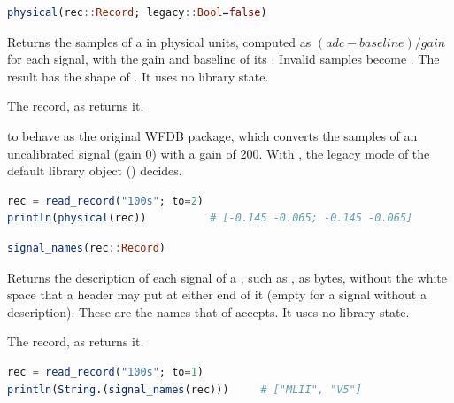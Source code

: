 \begin{lstlisting}[language=Julia,style=signature]
physical(rec::Record; legacy::Bool=false)
\end{lstlisting}
Returns the samples of a  in physical units, computed as $(\mathit{adc} -
\mathit{baseline}) / \mathit{gain}$ for each signal, with the gain and baseline of its
. Invalid samples become . The result has the shape of
. It uses no library state.
\begin{params}
\item[rec] The record, as  returns it.
\item[legacy]  to behave as the original WFDB package, which converts the
  samples of an uncalibrated signal (gain 0) with a gain of 200. With , the
  legacy mode of the default library object () decides.
\end{params}
\begin{lstlisting}[language=Julia,style=example]
rec = read_record("100s"; to=2)
println(physical(rec))          # [-0.145 -0.065; -0.145 -0.065]
\end{lstlisting}

\begin{lstlisting}[language=Julia,style=signature]
signal_names(rec::Record)
\end{lstlisting}
Returns the description of each signal of a , such as , as
bytes, without the white space that a header may put at either end of it (empty for a
signal without a description). These are the names that  of
 accepts. It uses no library state.
\begin{params}
\item[rec] The record, as  returns it.
\end{params}
\begin{lstlisting}[language=Julia,style=example]
rec = read_record("100s"; to=1)
println(String.(signal_names(rec)))     # ["MLII", "V5"]
\end{lstlisting}

